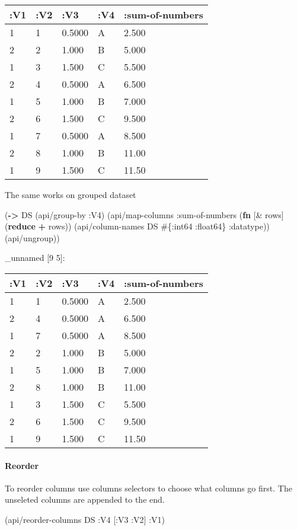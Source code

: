 \documentclass[]{article}
\newenvironment{Shaded}{\begin{snugshade}}{\end{snugshade}}
\newcommand{\KeywordTok}[1]{\textcolor[rgb]{0.13,0.29,0.53}{\textbf{#1}}}
\newcommand{\AttributeTok}[1]{\textcolor[rgb]{0.77,0.63,0.00}{#1}}
\newcommand{\NormalTok}[1]{#1}
\let\oldparagraph\paragraph
\renewcommand{\paragraph}[1]{\oldparagraph{#1}\mbox{}}
\begin{document}
\begin{longtable}[]{@{}lllll@{}}
\toprule
:V1 & :V2 & :V3 & :V4 & :sum-of-numbers\tabularnewline
\midrule
\endhead
1 & 1 & 0.5000 & A & 2.500\tabularnewline
2 & 2 & 1.000 & B & 5.000\tabularnewline
1 & 3 & 1.500 & C & 5.500\tabularnewline
2 & 4 & 0.5000 & A & 6.500\tabularnewline
1 & 5 & 1.000 & B & 7.000\tabularnewline
2 & 6 & 1.500 & C & 9.500\tabularnewline
1 & 7 & 0.5000 & A & 8.500\tabularnewline
2 & 8 & 1.000 & B & 11.00\tabularnewline
1 & 9 & 1.500 & C & 11.50\tabularnewline
\bottomrule
\end{longtable}

The same works on grouped dataset

\begin{Shaded}
\begin{Highlighting}[]
\NormalTok{(}\KeywordTok{->}\NormalTok{ DS}
\NormalTok{    (api/group-by }\AttributeTok{:V4}\NormalTok{)}
\NormalTok{    (api/map-columns }\AttributeTok{:sum-of-numbers}\NormalTok{ (}\KeywordTok{fn}\NormalTok{ [& rows]}
\NormalTok{                                       (}\KeywordTok{reduce} \KeywordTok{+}\NormalTok{ rows)) (api/column-names DS  #\{}\AttributeTok{:int64} \AttributeTok{:float64}\NormalTok{\} }\AttributeTok{:datatype}\NormalTok{))}
\NormalTok{    (api/ungroup))}
\end{Highlighting}
\end{Shaded}

\_unnamed {[}9 5{]}:

\begin{longtable}[]{@{}lllll@{}}
\toprule
:V1 & :V2 & :V3 & :V4 & :sum-of-numbers\tabularnewline
\midrule
\endhead
1 & 1 & 0.5000 & A & 2.500\tabularnewline
2 & 4 & 0.5000 & A & 6.500\tabularnewline
1 & 7 & 0.5000 & A & 8.500\tabularnewline
2 & 2 & 1.000 & B & 5.000\tabularnewline
1 & 5 & 1.000 & B & 7.000\tabularnewline
2 & 8 & 1.000 & B & 11.00\tabularnewline
1 & 3 & 1.500 & C & 5.500\tabularnewline
2 & 6 & 1.500 & C & 9.500\tabularnewline
1 & 9 & 1.500 & C & 11.50\tabularnewline
\bottomrule
\end{longtable}

\paragraph{Reorder}\label{reorder}

To reorder columns use columns selectors to choose what columns go
first. The unseleted columns are appended to the end.

\begin{Shaded}
\begin{Highlighting}[]
\NormalTok{(api/reorder-columns DS }\AttributeTok{:V4}\NormalTok{ [}\AttributeTok{:V3} \AttributeTok{:V2}\NormalTok{] }\AttributeTok{:V1}\NormalTok{)}
\end{Highlighting}
\end{Shaded}
\end{document}

